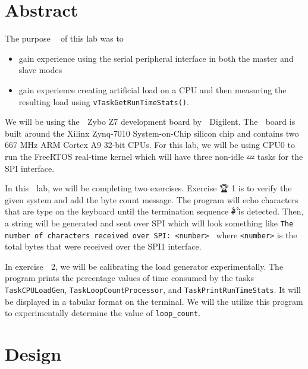 \documentclass[11pt, letterpaper, titlepage]{article}
\title{\textbf{\Huge{ 
\begin{center}
ECE 315 Lab 3 🧀
\end{center} 
}}}
\author{For Ahmed and Shyama 🎁💯🙏 \\ \\ 🚙 Lora Ma \\ 🌎 Benjamin Kong \\ \\ECE 315 Lab Section H41}
\begin{document}
\maketitle
\thispagestyle{empty}
\tableofcontents 
\newpage
{}

\section{Abstract}
The purpose 🔬💯 of this lab was to 
\begin{itemize}
  \item gain experience using the serial peripheral interface in both the master and slave modes
  \item gain experience creating artificial load on a CPU and then measuring the resulting load using \texttt{vTaskGetRunTimeStats()}.
\end{itemize}
We will be using the 🎱 Zybo Z7 development board by 🚰 Digilent. The 🧀 board is built around the Xilinx Zynq-7010 System-on-Chip silicon chip and contains two 667 MHz ARM Cortex A9 32-bit CPUs. For this lab, we will be using CPU0 to run the FreeRTOS real-time kernel which will have three non-idle 💤 tasks for the SPI interface. 

In this 🚀 lab, we will be completing two exercises. Exercise 🏆 1 is to verify the given system and add the byte count message. The program will echo characters that are type on the keyboard until the termination sequence \texttt{\r#\r} is detected. Then, a string will be generated and sent over SPI which will look something like \texttt{The number of characters received over SPI: <number> \n} where \texttt{<number>} is the total bytes that were received over the SPI1 interface.

In exercise 🎯 2, we will be calibrating the load generator experimentally. The program prints the percentage values of time consumed by the tasks \texttt{TaskCPULoadGen}, \texttt{TaskLoopCountProcessor}, and \texttt{TaskPrintRunTimeStats}. It will be displayed in a tabular format on the terminal. We will the utilize this program to experimentally determine the value of \texttt{loop_count}. 

\section{Design}
\end{document}
